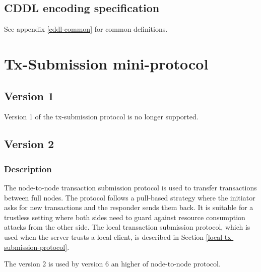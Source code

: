 \subsection{CDDL encoding specification}

See appendix \ref{cddl-common} for common definitions.

\section{Tx-Submission mini-protocol}
\subsection{Version 1}
Version 1 of the tx-submission protocol is no longer supported.

\subsection{Version 2}
\label{tx-submission-protocol2}
\newcommand{\StInit}  {\state{StInit}}
\newcommand{\MsgInit} {\trans{MsgInit}}
\newcommand{\StTxIdsBlocking}    {\state{StTxIdsBlocking}}
\newcommand{\StTxIdsNonBlocking} {\state{StTxIdsNonBlocking}}
\newcommand{\StTxs}              {\state{StTxs}}
\newcommand{\MsgRequestTxIdsNB}  {\trans{MsgRequestTxIdsNonBlocking}}
\newcommand{\MsgRequestTxIdsB}   {\trans{MsgRequestTxIdsBlocking}}
\newcommand{\MsgReplyTxIds}      {\trans{MsgReplyTxIds}}
\newcommand{\MsgRequestTxs}      {\trans{MsgRequestTxs}}
\newcommand{\MsgReplyTxs}        {\trans{MsgReplyTxs}}

\subsubsection{Description}
The node-to-node transaction submission protocol is used to transfer
transactions between full nodes.  The protocol follows a pull-based strategy
where the initiator asks for new transactions and the responder sends them
back.  It is suitable for a trustless setting where both sides need to guard
against resource consumption attacks from the other side.  The local
transaction submission protocol, which is used when the server trusts a local
client, is described in Section \ref{local-tx-submission-protocol}.

The version 2 is used by version 6 an higher of node-to-node protocol.

